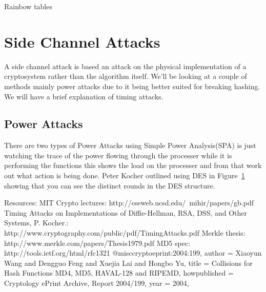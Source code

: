 \documentclass[a4paper,12pt]{article}
\begin{document}
Rainbow tables



\section{Side Channel Attacks}
A side channel attack is based an attack on the physical implementation of a cryptosystem rather than the algorithm itself. We'll be looking at a couple of methods mainly power attacks due to it being better suited for breaking hashing. We will have a brief explanation of timing attacks.

\subsection{Power Attacks}
There are two types of Power Attacks using Simple Power Analysis(SPA) is just watching the trace of the power flowing through the processer while it is performing the functions this shows the load on the processer and from that work out what action is being done. Peter Kocher outlined using DES in Figure~\ref{fig:desRound} showing that you can see the distinct rounds in the DES structure. 

\color{red}{TALK ABOUT DPA}

\color{red}{TALK ABOUT DPA AGAINST HMAC-MD5}

\begin{figure}
    \label{fig:desRound}
\end{figure}

Resources:
MIT Crypto lectures: http://cseweb.ucsd.edu/~mihir/papers/gb.pdf
Timing Attacks on Implementations of Diffie-Hellman, RSA, DSS, and Other Systems, P. Kocher.: http://www.cryptography.com/public/pdf/TimingAttacks.pdf
Merkle thesis: http://www.merkle.com/papers/Thesis1979.pdf 
MD5 spec: http://tools.ietf.org/html/rfc1321 
@misc{cryptoeprint:2004:199,
    author = {Xiaoyun Wang  and Dengguo Feng and Xuejia Lai and Hongbo Yu},
    title = {Collisions for Hash Functions MD4, MD5, HAVAL-128 and RIPEMD},
    howpublished = {Cryptology ePrint Archive, Report 2004/199},
    year = {2004},
}
\end{document}

